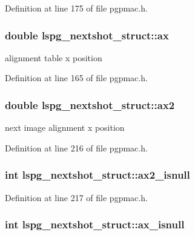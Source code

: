 Definition at line 175 of file pgpmac.h.\hypertarget{structlspg__nextshot__struct_a7f57874223897ab7d9c7531a9522904d}{
\subsubsection[{ax}]{\setlength{\rightskip}{0pt plus 5cm}double {\bf lspg\_\-nextshot\_\-struct::ax}}}
\label{structlspg__nextshot__struct_a7f57874223897ab7d9c7531a9522904d}


alignment table x position 

Definition at line 165 of file pgpmac.h.\hypertarget{structlspg__nextshot__struct_ab76bd38d2a098bc7eda82aff5dcb9c66}{
\subsubsection[{ax2}]{\setlength{\rightskip}{0pt plus 5cm}double {\bf lspg\_\-nextshot\_\-struct::ax2}}}
\label{structlspg__nextshot__struct_ab76bd38d2a098bc7eda82aff5dcb9c66}


next image alignment x position 

Definition at line 216 of file pgpmac.h.\hypertarget{structlspg__nextshot__struct_a846845b0b9ecf6517ef85554771ec71d}{
\subsubsection[{ax2\_\-isnull}]{\setlength{\rightskip}{0pt plus 5cm}int {\bf lspg\_\-nextshot\_\-struct::ax2\_\-isnull}}}
\label{structlspg__nextshot__struct_a846845b0b9ecf6517ef85554771ec71d}


Definition at line 217 of file pgpmac.h.\hypertarget{structlspg__nextshot__struct_aae46c7911b2b218497ad4a68f3dbb7d9}{
\subsubsection[{ax\_\-isnull}]{\setlength{\rightskip}{0pt plus 5cm}int {\bf lspg\_\-nextshot\_\-struct::ax\_\-isnull}}}
\label{structlspg__nextshot__struct_aae46c7911b2b218497ad4a68f3dbb7d9}


